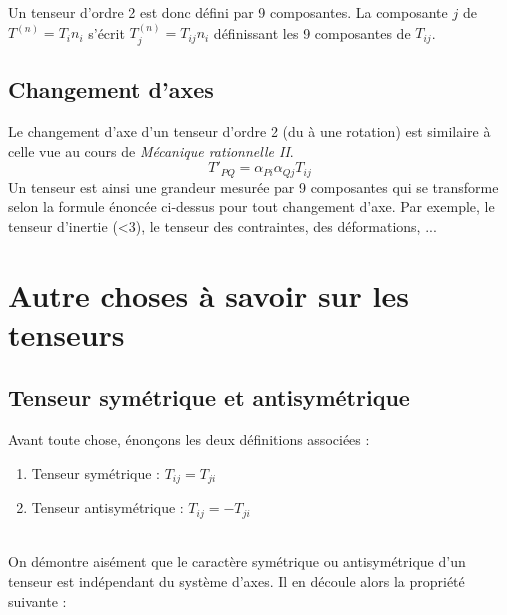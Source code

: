 Un tenseur d'ordre 2 est donc défini par 9 composantes. La composante $j$ de $T^{(n)} =
T_in_i$ s'écrit $T^{(n)}_j = T_{ij}n_i$ définissant les 9 composantes de $T_{ij}$.
    
    
\subsection{Changement d'axes}
Le changement d'axe d'un tenseur d'ordre 2 (du à une rotation) est similaire à celle vue au cours
de \textit{Mécanique rationnelle II}.
\begin{equation}
	T'_{PQ} = \alpha_{Pi}\alpha_{Qj}T_{ij}
\end{equation}
Un tenseur est ainsi une grandeur mesurée par 9 composantes qui se transforme selon la formule
énoncée ci-dessus pour tout changement d'axe. Par exemple, le tenseur d'inertie (<3), le tenseur
des contraintes, des déformations, ...


\section{Autre choses à savoir sur les tenseurs}
\subsection{Tenseur symétrique et antisymétrique}
Avant toute chose, énonçons les deux définitions associées :
\begin{enumerate}
	\item Tenseur symétrique : $T_{ij} = T_{ji}$
	\item Tenseur antisymétrique : $T_{ij} = -T_{ji}$
\end{enumerate}
        
\ \\
        
On démontre aisément que le caractère symétrique ou antisymétrique d'un tenseur est 
indépendant du système d'axes. Il en découle alors la propriété suivante :\\
        
